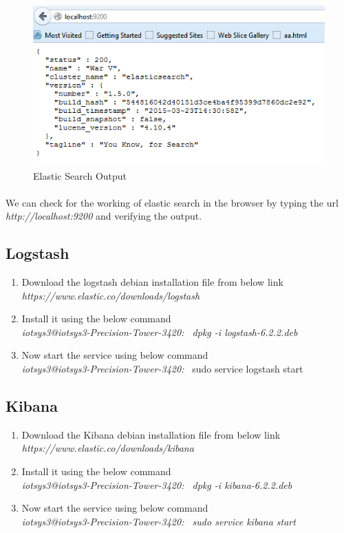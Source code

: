 \documentclass{article}
\begin{document}
\begin{figure}[H]
\centering
\caption{Elastic Search Output}
\includegraphics[scale=0.7]{Elastic_Search_Installation}
\end{figure}

\paragraph{}
We can check for the working of elastic search in the browser by typing the url \textit{http://localhost:9200} and verifying the output.

\subsection{Logstash}

\begin{enumerate}
\item Download the logstash debian installation file from below link\\
\textit{https://www.elastic.co/downloads/logstash}
\item Install it using the below command \\
\textit {{\color{blue}iotsys3@iotsys3-Precision-Tower-3420:~} dpkg -i logstash-6.2.2.deb}
\item Now start the service using below command\\
\textit{\color{blue}iotsys3@iotsys3-Precision-Tower-3420:~} sudo service logstash start
\end{enumerate}

\subsection{Kibana}

\begin{enumerate}
\item Download the Kibana debian installation file from below link\\
\textit{https://www.elastic.co/downloads/kibana}
\item Install it using the below command\\
\textit{{\color{blue}iotsys3@iotsys3-Precision-Tower-3420:~} dpkg -i kibana-6.2.2.deb}
\item Now start the service using below command\\
\textit{{\color{blue}iotsys3@iotsys3-Precision-Tower-3420:~} sudo service kibana start}
\end{enumerate}
\end{document}
